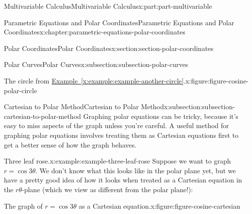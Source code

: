 \documentclass[twoside,10pt,]{book}
\newcommand{\xreffont}{\relax}
\numberwithin{equation}{part}
\begin{document}
\begin{partptx}{Multivariable Calculus}{}{Multivariable Calculus}{}{}{x:part:part-multivariable}
\begin{chapterptx}{Parametric Equations and Polar Coordinates}{}{Parametric Equations and Polar Coordinates}{}{}{x:chapter:parametric-equations-polar-coordinates}
\begin{sectionptx}{Polar Coordinates}{}{Polar Coordinates}{}{}{x:section:section-polar-coordinates}
\begin{subsectionptx}{Polar Curves}{}{Polar Curves}{}{}{x:subsection:subsection-polar-curves}
\begin{figureptx}{The circle from \hyperref[x:example:example-another-circle]{Example~{\xreffont\ref{x:example:example-another-circle}}}.}{x:figure:figure-cosine-polar-circle}{}
\begin{image}{0}{1}{0}
{
}%
\end{image}%
\tcblower
\end{figureptx}%
\end{subsectionptx}
%
%
\typeout{************************************************}
\typeout{************************************************}
%
\begin{subsectionptx}{Cartesian to Polar Method}{}{Cartesian to Polar Method}{}{}{x:subsection:subsection-cartesian-to-polar-method}
Graphing polar equations can be tricky, because it's easy to miss aspects of the graph unless you're careful. A useful method for graphing polar equations involves treating them as Cartesian equations first to get a better sense of how the graph behaves.%
\begin{example}{Three leaf rose.}{x:example:example-three-leaf-rose}%
Suppose we want to graph \(r = \cos3\theta\). We don't know what this looks like in the polar plane yet, but we have a pretty good idea of how it looks when treated as a Cartesian equation in the \(r\theta\)-plane (which we view as different from the polar plane!):%
\begin{figureptx}{The graph of \(r=\cos3\theta\) as a Cartesian equation.}{x:figure:figure-cosine-cartesian}{}%
\begin{image}{0}{1}{0}%
\end{image}
\end{figureptx}
\end{example}
\end{subsectionptx}
\end{sectionptx}
\end{chapterptx}
\end{partptx}
\end{document}
